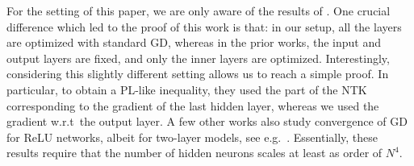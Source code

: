 \documentclass{article}
\begin{document}

For the setting of this paper, we are only aware of the results of \cite{AllenZhuEtal2018,ZouGu2019}.
One crucial difference which led to the proof of this work is that:
in our setup, all the layers are optimized with standard GD, 
whereas in the prior works, the input and output layers are fixed, and only the inner layers are optimized.
Interestingly, considering this slightly different setting allows us to reach a simple proof.
In particular, to obtain a PL-like inequality, they used the part of the NTK corresponding to the gradient of the last hidden layer,
whereas we used the gradient w.r.t\ the output layer.
A few other works also study convergence of GD for ReLU networks, albeit for two-layer models,
see e.g.\ \cite{arora2019fine, DuEtal2018_ICLR, OymakMahdi2019}.
Essentially, these results require that the number of hidden neurons scales at least as order of $N^4$.
\end{document}
